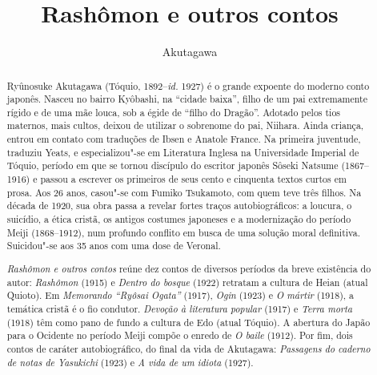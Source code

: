 \documentclass[12pt]{extarticle}
\begin{document}
\newcommand{\AutorLivro}{Akutagawa}
\newcommand{\TituloLivro}{Rashômon e outros contos}
\newcommand{\Tema}{Ficção, mistério e fantasia}
\newcommand{\Genero}{Conto, crônica e novela}
\newcommand{\imagemCapa}{./images/PNLD0009-01.png}
\newcommand{\issnppub}{978-65-86238-33-4}
\newcommand{\issnepub}{978-65-86238-32-7}
\newcommand{\colaborador}{{Cesar Augusto Araujo Oyakawa, Bruno Gradella e Vicente Castro}}


\title{\TituloLivro}
\author{\AutorLivro}
\def\authornotes{\colaborador}

\date{}
\maketitle

\baselineskip\par

\begin{abstract}

Ryûnosuke Akutagawa (Tóquio, 1892--\textit{id.} 1927) é o grande
  expoente do moderno conto japonês. Nasceu no bairro Kyôbashi, na ``cidade
  baixa'', filho de um pai extremamente rígido e de uma mãe louca, sob a égide
  de ``filho do Dragão''. Adotado pelos tios maternos, mais cultos, deixou de
  utilizar o sobrenome do pai, Niihara. Ainda criança, entrou em contato com
  traduções de Ibsen e Anatole France. Na primeira juventude, traduziu Yeats, e
  especializou"-se em Literatura Inglesa na Universidade Imperial de Tóquio,
  período em que se tornou discípulo do escritor japonês Sôseki Natsume
  (1867--1916) e passou a escrever os primeiros de seus cento e cinquenta
  textos curtos em prosa. Aos 26 anos, casou"-se com Fumiko Tsukamoto, com quem
  teve três filhos.  Na década de 1920, sua obra passa a revelar fortes traços
  autobiográficos: a loucura, o suicídio, a ética cristã, os antigos costumes
  japoneses e a modernização do período Meiji (1868--1912), num profundo
  conflito em busca de uma solução moral definitiva.  Suicidou"-se aos 35 anos
  com uma dose de Veronal. 
        
\textit{Rashômon e outros contos} reúne dez contos de diversos períodos da
  breve existência do autor: \textit{Rashômon} (1915) e \textit{Dentro do
  bosque} (1922) retratam a cultura de Heian (atual Quioto). Em
  \textit{Memorando ``Ryôsai Ogata''} (1917), \textit{Ogin} (1923) e \textit{O
  mártir} (1918), a temática cristã é o fio condutor.  \textit{Devoção à
  literatura popular} (1917) e \textit{Terra morta} (1918) têm como pano de
  fundo a cultura de Edo (atual Tóquio). A abertura do Japão para o Ocidente no
  período Meiji compõe o enredo de \textit{O baile} (1912). Por fim, dois
  contos de caráter autobiográfico, do final da vida de Akutagawa:
  \textit{Passagens do caderno de notas de Yasukichi} (1923) e \textit{A vida
de um idiota} (1927).      \end{abstract}
\end{document}
